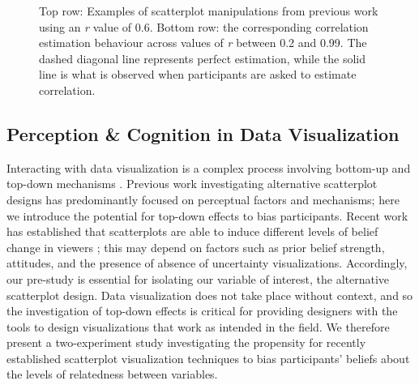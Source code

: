 \documentclass[manuscript,screen,review,anonymous]{acmart}
\begin{document}
\begin{figure}


\caption{\label{fig-previous-manipulations}Top row: Examples of
scatterplot manipulations from previous work using an \textit{r} value
of 0.6. Bottom row: the corresponding correlation estimation behaviour
across values of \textit{r} between 0.2 and 0.99. The dashed diagonal
line represents perfect estimation, while the solid line is what is
observed when participants are asked to estimate correlation.}

\end{figure}%

\subsection{Perception \& Cognition in Data
Visualization}\label{sec-perception-cognition}

Interacting with data visualization is a complex process involving
bottom-up and top-down mechanisms
\citep{shah_2011, franconeri_2021, xiong_2022}. Previous work
investigating alternative scatterplot designs has predominantly focused
on perceptual factors and mechanisms; here we introduce the potential
for top-down effects to bias participants. Recent work has established
that scatterplots are able to induce different levels of belief change
in viewers \citep{karduni_2020, markant_2023}; this may depend on
factors such as prior belief strength, attitudes, and the presence of
absence of uncertainty visualizations. Accordingly, our pre-study is
essential for isolating our variable of interest, the alternative
scatterplot design. Data visualization does not take place without
context, and so the investigation of top-down effects is critical for
providing designers with the tools to design visualizations that work as
intended in the field. We therefore present a two-experiment study
investigating the propensity for recently established scatterplot
visualization techniques to bias participants' beliefs about the levels
of relatedness between variables.
\end{document}
